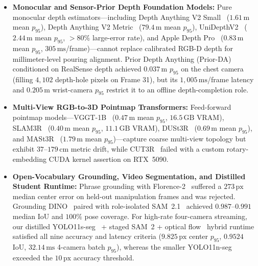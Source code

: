 \documentclass[10pt,journal]{IEEEtran}
\begin{document}
\begin{itemize}
    \item \textbf{Monocular and Sensor-Prior Depth Foundation Models:} Pure monocular depth estimators---including Depth Anything V2 Small~\cite{yang2024depthv2} ($1.61\,\mathrm{m}$ mean $p_{95}$), Depth Anything V2 Metric~\cite{yang2024depthv2} ($79.4\,\mathrm{m}$ mean $p_{95}$), UniDepthV2~\cite{piccinelli2025unidepthv2} ($2.44\,\mathrm{m}$ mean $p_{95}$, $>80\%$ large-error rate), and Apple Depth Pro~\cite{bochkovskii2025depthpro} ($0.83\,\mathrm{m}$ mean $p_{95}$, $305\,\mathrm{ms}$/frame)---cannot replace calibrated RGB-D depth for millimeter-level pouring alignment. Prior Depth Anything (Prior-DA)~\cite{wang2025priorda} conditioned on RealSense depth achieved $0.037\,\mathrm{m}$ $p_{95}$ on the chest camera (filling $4{,}102$ depth-hole pixels on Frame 31), but its $1{,}005\,\mathrm{ms}$/frame latency and $0.205\,\mathrm{m}$ wrist-camera $p_{95}$ restrict it to an offline depth-completion role.
    \item \textbf{Multi-View RGB-to-3D Pointmap Transformers:} Feed-forward pointmap models---VGGT-1B~\cite{wang2025vggt} ($0.47\,\mathrm{m}$ mean $p_{95}$, $16.5\,\mathrm{GB}$ VRAM), SLAM3R~\cite{liu2025slam3r} ($0.40\,\mathrm{m}$ mean $p_{95}$, $11.1\,\mathrm{GB}$ VRAM), DUSt3R~\cite{wang2024dust3r} ($0.69\,\mathrm{m}$ mean $p_{95}$), and MASt3R~\cite{leroy2024mast3r} ($1.79\,\mathrm{m}$ mean $p_{95}$)---capture coarse multi-view topology but exhibit $37$--$179\,\mathrm{cm}$ metric drift, while CUT3R~\cite{wang2025cut3r} failed with a custom rotary-embedding CUDA kernel assertion on RTX~5090.
    \item \textbf{Open-Vocabulary Grounding, Video Segmentation, and Distilled Student Runtime:} Phrase grounding with Florence-2~\cite{xiao2024florence2} suffered a $273\,\mathrm{px}$ median center error on held-out manipulation frames and was rejected. Grounding DINO~\cite{liu2023grounding} paired with role-isolated SAM~2.1~\cite{ravi2024sam2} achieved $0.987$--$0.991$ median IoU and $100\%$ pose coverage. For high-rate four-camera streaming, our distilled YOLO11s-seg~\cite{jocher2024yolo11} + staged SAM~2 + optical flow~\cite{lucas1981iterative,farneback2003two} hybrid runtime satisfied all nine accuracy and latency criteria ($9.825\,\mathrm{px}$ center $p_{95}$, $0.9524$ IoU, $32.14\,\mathrm{ms}$ 4-camera batch $p_{95}$), whereas the smaller YOLO11n-seg~\cite{jocher2024yolo11} exceeded the $10\,\mathrm{px}$ accuracy threshold.

\end{itemize}
\end{document}

